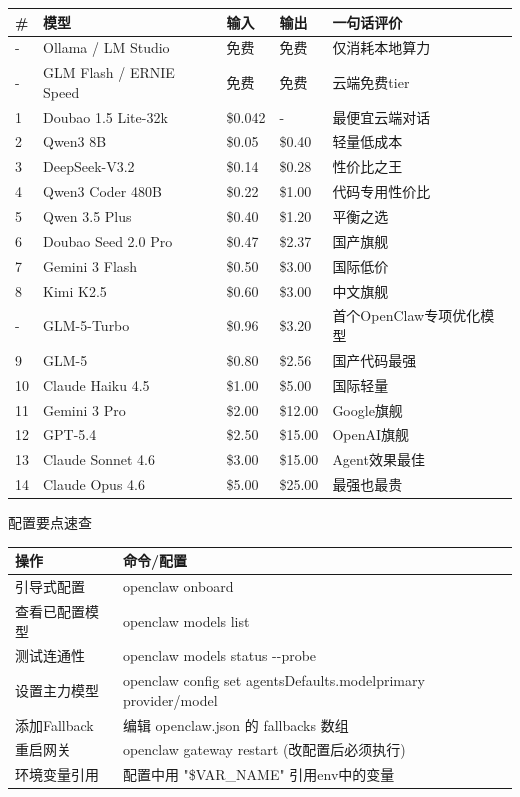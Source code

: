 \documentclass[
  10
]{article}
\newcounter{none} %
\begin{document}
{\def\LTcaptype{none} %
\begin{longtable}[]{@{}|l|l|l|l|l|@{}}
\toprule\noalign{}
\endhead
\bottomrule\noalign{}
\endlastfoot
\hline
\# & 模型 & 输入 & 输出 & 一句话评价 \\
\hline
- & Ollama / LM Studio & 免费 & 免费 & 仅消耗本地算力 \\
\hline
- & GLM Flash / ERNIE Speed & 免费 & 免费 & 云端免费tier \\
\hline
1 & Doubao 1.5 Lite-32k & \$0.042 & - & 最便宜云端对话 \\
\hline
2 & Qwen3 8B & \$0.05 & \$0.40 & 轻量低成本 \\
\hline
3 & DeepSeek-V3.2 & \$0.14 & \$0.28 & 性价比之王 \\
\hline
4 & Qwen3 Coder 480B & \$0.22 & \$1.00 & 代码专用性价比 \\
\hline
5 & Qwen 3.5 Plus & \$0.40 & \$1.20 & 平衡之选 \\
\hline
6 & Doubao Seed 2.0 Pro & \$0.47 & \$2.37 & 国产旗舰 \\
\hline
7 & Gemini 3 Flash & \$0.50 & \$3.00 & 国际低价 \\
\hline
8 & Kimi K2.5 & \$0.60 & \$3.00 & 中文旗舰 \\
\hline
- & GLM-5-Turbo & \$0.96 & \$3.20 & 首个OpenClaw专项优化模型 \\
\hline
9 & GLM-5 & \$0.80 & \$2.56 & 国产代码最强 \\
\hline
10 & Claude Haiku 4.5 & \$1.00 & \$5.00 & 国际轻量 \\
\hline
11 & Gemini 3 Pro & \$2.00 & \$12.00 & Google旗舰 \\
\hline
12 & GPT-5.4 & \$2.50 & \$15.00 & OpenAI旗舰 \\
\hline
13 & Claude Sonnet 4.6 & \$3.00 & \$15.00 & Agent效果最佳 \\
\hline
14 & Claude Opus 4.6 & \$5.00 & \$25.00 & 最强也最贵 \\
\hline
\end{longtable}
}

配置要点速查

{\def\LTcaptype{none} %
\begin{longtable}[]{@{}|l|l|@{}}
\toprule\noalign{}
\endhead
\bottomrule\noalign{}
\endlastfoot
\hline
操作 & 命令/配置 \\
\hline
引导式配置 & openclaw onboard \\
\hline
查看已配置模型 & openclaw models list \\
\hline
测试连通性 & openclaw models status -\/-probe \\
\hline
设置主力模型 & openclaw config set agentsDefaults.modelprimary
provider/model \\
\hline
添加Fallback & 编辑 openclaw.json 的 fallbacks 数组 \\
\hline
重启网关 & openclaw gateway restart (改配置后必须执行) \\
\hline
环境变量引用 & 配置中用 "\$VAR\_NAME" 引用env中的变量 \\
\hline
\end{longtable}
}
\end{document}
